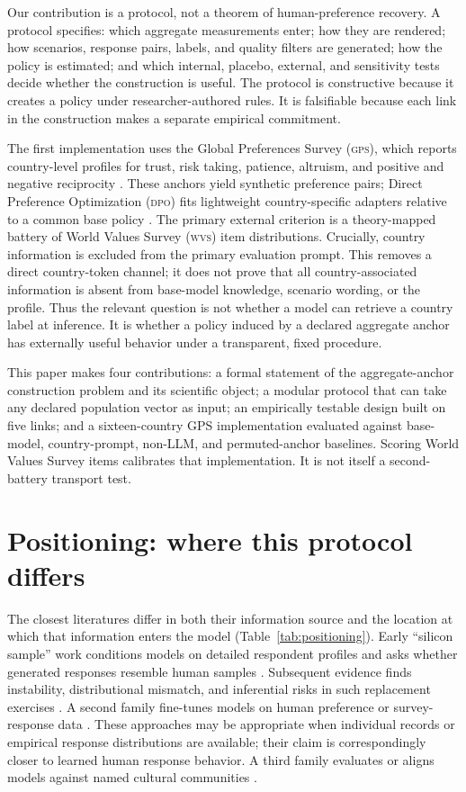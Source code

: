 \documentclass[10pt,letterpaper]{article}
\newcommand{\WVS}{\textsc{wvs}}
\newcommand{\GPS}{\textsc{gps}}
\newcommand{\DPO}{\textsc{dpo}}
\begin{document}
Our contribution is a protocol, not a theorem of human-preference recovery. A protocol specifies: which aggregate measurements enter; how they are rendered; how scenarios, response pairs, labels, and quality filters are generated; how the policy is estimated; and which internal, placebo, external, and sensitivity tests decide whether the construction is useful. The protocol is constructive because it creates a policy under researcher-authored rules. It is falsifiable because each link in the construction makes a separate empirical commitment.

The first implementation uses the Global Preferences Survey (\GPS), which reports country-level profiles for trust, risk taking, patience, altruism, and positive and negative reciprocity \cite{falk2018}. These anchors yield synthetic preference pairs; Direct Preference Optimization (\DPO) fits lightweight country-specific adapters relative to a common base policy \cite{rafailov2023}. The primary external criterion is a theory-mapped battery of World Values Survey (\WVS) item distributions. Crucially, country information is excluded from the primary evaluation prompt. This removes a direct country-token channel; it does not prove that all country-associated information is absent from base-model knowledge, scenario wording, or the profile. Thus the relevant question is not whether a model can retrieve a country label at inference. It is whether a policy induced by a declared aggregate anchor has externally useful behavior under a transparent, fixed procedure.

This paper makes four contributions: a formal statement of the aggregate-anchor construction problem and its scientific object; a modular protocol that can take any declared population vector as input; an empirically testable design built on five links; and a sixteen-country GPS implementation evaluated against base-model, country-prompt, non-LLM, and permuted-anchor baselines. Scoring World Values Survey items calibrates that implementation. It is not itself a second-battery transport test.

\section{Positioning: where this protocol differs}
The closest literatures differ in both their information source and the location at which that information enters the model (Table~\ref{tab:positioning}). Early ``silicon sample'' work conditions models on detailed respondent profiles and asks whether generated responses resemble human samples \cite{argyle2023,abels2026,capra2025}. Subsequent evidence finds instability, distributional mismatch, and inferential risks in such replacement exercises \cite{bisbee2024,boelaert2025,dalloul2026}. A second family fine-tunes models on human preference or survey-response data \cite{suh2025,krsteski2026,cao2025}. These approaches may be appropriate when individual records or empirical response distributions are available; their claim is correspondingly closer to learned human response behavior. A third family evaluates or aligns models against named cultural communities \cite{tao2024}.
\end{document}
